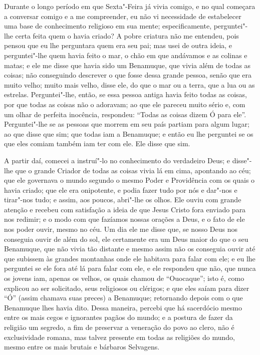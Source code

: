 Durante o longo período em que Sexta"-Feira já vivia comigo, e no qual
começara a conversar comigo e a me compreender, eu não vi necessidade de
estabelecer uma base de conhecimento religioso em sua mente;
especificamente, perguntei"-lhe certa feita quem o havia criado? A pobre
criatura não me entendeu, pois pensou que eu lhe perguntara quem era seu
pai; mas usei de outra ideia, e perguntei"-lhe quem havia feito o mar, o
chão em que andávamos e as colinas e matas; e ele me disse que havia
sido um Benamuque, que vivia além de todas as coisas; não conseguindo
descrever o que fosse dessa grande pessoa, senão que era muito velho;
muito mais velho, disse ele, do que o mar ou a terra, que a lua ou as
estrelas. Perguntei"-lhe, então, se essa pessoa antiga havia feito todas
as coisas, por que todas as coisas não o adoravam; ao que ele pareceu
muito sério e, com um olhar de perfeita inocência, respondeu: ``Todas as
coisas dizem Ó para ele''. Perguntei"-lhe se as pessoas que morrem em seu
país partiam para algum lugar; ao que disse que sim; que todas iam a
Benamuque; e então eu lhe perguntei se os que eles comiam também iam ter
com ele. Ele disse que sim.

A partir daí, comecei a instruí"-lo no conhecimento do verdadeiro Deus; e
disse"-lhe que o grande Criador de todas as coisas vivia lá em cima,
apontando ao céu; que ele governava o mundo segundo o mesmo Poder e
Providência com os quais o havia criado; que ele era onipotente, e podia
fazer tudo por nós e dar"-nos e tirar"-nos tudo; e assim, aos poucos,
abri"-lhe os olhos. Ele ouviu com grande atenção e recebeu com satisfação
a ideia de que Jesus Cristo fora enviado para nos redimir; e o modo com
que fazíamos nossas orações a Deus, e o fato de ele nos poder ouvir,
mesmo no céu. Um dia ele me disse que, se nosso Deus nos conseguia ouvir
de além do sol, ele certamente era um Deus maior do que o seu Benamuque,
que não vivia tão distante e mesmo assim não os conseguia ouvir até que
subissem às grandes montanhas onde ele habitava para falar com ele; e eu
lhe perguntei se ele fora até lá para falar com ele, e ele respondeu que
não, que nunca os jovens iam, apenas os velhos, os quais chamou de
``Ouocaque''; isto é, como explicou ao ser solicitado, seus religiosos
ou clérigos; e que eles saíam para dizer ``Ó'' (assim chamava suas
preces) a Benamuque; retornando depois com o que Benamuque lhes havia
dito. Dessa maneira, percebi que há sacerdócio mesmo entre os mais cegos
e ignorantes pagãos do mundo; e a postura de fazer da religião um
segredo, a fim de preservar a veneração do povo ao clero, não é
exclusividade romana, mas talvez presente em todas as religiões do
mundo, mesmo entre os mais brutais e bárbaros Selvagens.

